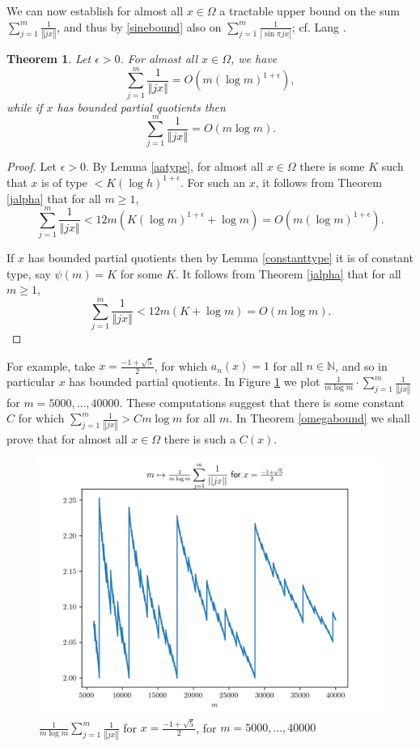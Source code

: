 \documentclass{article}
\newcommand{\norm}[1]{\left\Vert #1 \right\Vert}
\newtheorem{theorem}{Theorem}
\begin{document}
We can now establish for almost all $x \in \Omega$ a tractable upper bound on the sum $\sum_{j=1}^m \frac{1}{\norm{jx}}$, and thus
by \eqref{sinebound} also on $\sum_{j=1}^m \frac{1}{|\sin \pi  j x|}$; cf. Lang \cite[p.~44, Theorem 3]{MR0209227}.
 





\begin{theorem}
Let $\epsilon>0$. For almost all $x \in \Omega$, we have
\[
\sum_{j=1}^m \frac{1}{\norm{jx}} = O\left(m \left(\log m\right)^{1+\epsilon}\right),
\]
while if $x$ has bounded partial quotients then
\[
\sum_{j=1}^m \frac{1}{\norm{jx}} = O\left(m \log m \right).
\]
\label{reciprocaltheorem}
\end{theorem}
\begin{proof}
Let $\epsilon>0$. By Lemma \ref{aatype}, for almost all $x \in \Omega$ there is some $K$ such that $x$ is of type $<K(\log h)^{1+\epsilon}$.
For
such an $x$, it follows from Theorem \ref{jalpha} that for all $m \geq 1$,
\[
\sum_{j=1}^m \frac{1}{\norm{jx}} < 12m(K(\log m)^{1+\epsilon}+\log m)=O\left(m \left(\log m\right)^{1+\epsilon}\right).
\]

If $x$ has bounded partial quotients then by Lemma \ref{constanttype} it is of constant type, say $\psi(m)=K$ for some $K$. It follows from Theorem \ref{jalpha} that for all $m \geq 1$,
\[
\sum_{j=1}^m \frac{1}{\norm{jx}} < 12m(K+\log m)=O\left(m \log m \right).
\]
\end{proof}

For example, take $x=\frac{-1+\sqrt{5}}{2}$, for which $a_n(x)=1$ for all $n \in \mathbb{N}$, and so in particular $x$ has bounded partial quotients.
In Figure \ref{m5000_40000_g} we plot $\frac{1}{m \log m} \cdot \sum_{j=1}^m \frac{1}{\norm{jx}}$ for $m=5000,\ldots,40000$.  
 These computations suggest that there is some constant $C$ for which $\sum_{j=1}^m \frac{1}{\norm{jx}} > C m \log m$ for all $m$.
 In Theorem \ref{omegabound} we shall prove that for almost all $x \in \Omega$ there is such a $C(x)$.

\begin{figure}
\includegraphics[width=\textwidth]{m5000_40000_g}
\caption{$\frac{1}{m\log m} \sum_{j=1}^m \frac{1}{\norm{jx}}$ for $x=\frac{-1+\sqrt{5}}{2}$, for $m=5000,\ldots,40000$}
\label{m5000_40000_g}
\end{figure}
\end{document}
